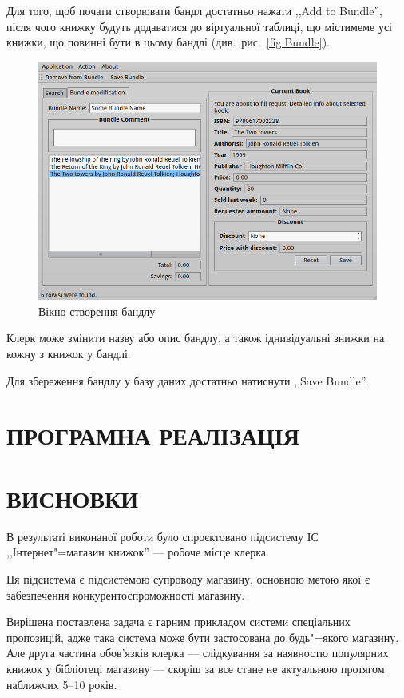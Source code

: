 \documentclass[a4paper,notitlepage,headsepline,pdftex,oneside]{report}
\newcommand{\setfontsize}[1]{\fontsize{#1pt}{#1pt}\selectfont}
\newcommand{\Chapter}[1]{\chapter{#1} \renewcommand{\baselinestretch}{1.5}\setfontsize{14pt}}
\newcommand{\uchapter}[1]{\chapter*{#1}\pagestyle{fancy}\renewcommand{\baselinestretch}{1.5}\setfontsize{14pt}\addcontentsline{toc}{chapter}{#1}}
\begin{document}
    Для того, щоб почати створювати бандл достатньо нажати ,,Add to Bundle'',
    після чого книжку будуть додаватися до віртуальної таблиці, що містимеме
    усі книжки, що повинні бути в цьому бандлі (див.~рис.~\ref{fig:Bundle}).
    \begin{figure}[h]
      \centering
      \includegraphics[width=\textwidth]{bundle.png}
      \caption{Вікно створення бандлу}
      \label{fig:bundle}
    \end{figure}

    Клерк може змінити назву або опис бандлу, а також іднивідуальні знижки на
    кожну з книжок у бандлі.

    Для збереження бандлу у базу даних достатньо натиснути ,,Save Bundle''.

\Chapter{ПРОГРАМНА РЕАЛІЗАЦІЯ}


\uchapter{ВИСНОВКИ}
  В результаті виконаної роботи було спроєктовано підсистему ІС
  ,,Інтернет"=магазин книжок'' --- робоче місце клерка.

  Ця підсистема є підсистемою супроводу магазину, основною метою якої є
  забезпечення конкурентоспроможності магазину.

  Вирішена поставлена задача є гарним прикладом системи спеціальних
  пропозицій, адже така система може бути застосована до будь"=якого магазину.
  Але друга частина обов’язків клерка --- слідкування за наявностю популярних
  книжок у бібліотеці магазину --- скоріш за все стане не актуальною протягом
  наближчих 5--10 років.
\end{document}
